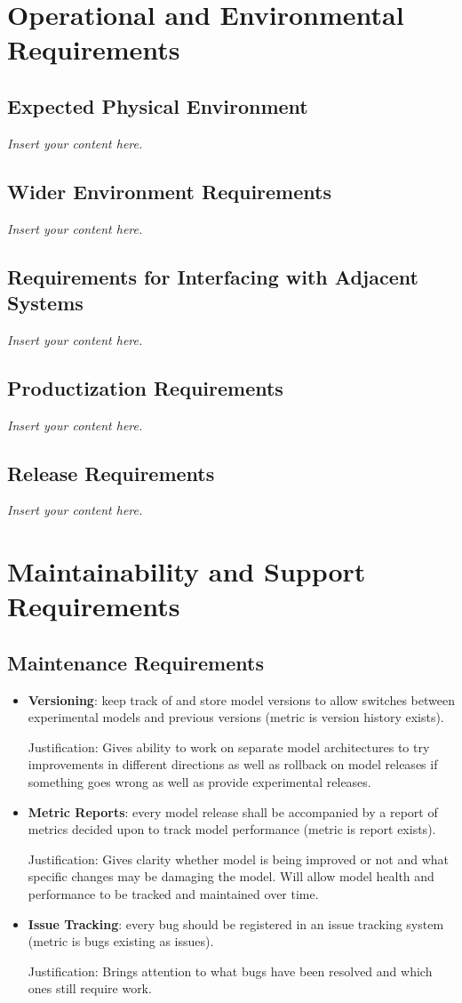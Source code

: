 \documentclass[12pt]{article}
\newcommand{\lips}{\textit{Insert your content here.}}
\begin{document}
\section{Operational and Environmental Requirements}
\subsection{Expected Physical Environment}
\lips
\subsection{Wider Environment Requirements}
\lips
\subsection{Requirements for Interfacing with Adjacent Systems}
\lips
\subsection{Productization Requirements}
\lips
\subsection{Release Requirements}
\lips

\section{Maintainability and Support Requirements}
\subsection{Maintenance Requirements}
\begin{itemize}
    \item \textbf{Versioning}: keep track of and store model versions to allow
     switches between experimental models and previous versions (metric is 
     version history exists).

    Justification: Gives ability to work on separate model architectures to try 
    improvements in different directions as well as rollback on model releases 
    if something goes wrong as well as provide experimental releases.
    
    \item \textbf{Metric Reports}: every model release shall be accompanied by 
    a report of metrics decided upon to track model performance (metric is 
    report exists).

    Justification: Gives clarity whether model is being improved or not and what
     specific changes may be damaging the model. Will allow model health and 
     performance to be tracked and maintained over time.

    \item \textbf{Issue Tracking}: every bug should be registered in an issue 
    tracking system (metric is bugs existing as issues). 

    Justification: Brings attention to what bugs have been resolved and which 
    ones still require work.
    
\end{itemize}
\end{document}
